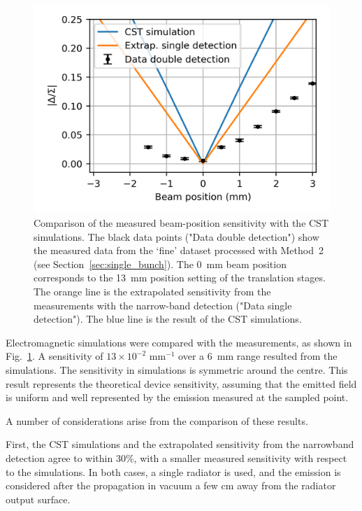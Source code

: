 \begin{figure}[!t]
\centering
\includegraphics[scale=1, keepaspectratio]{pictures/sim_vs_data_abs}
\caption{Comparison of the measured beam-position sensitivity with the CST simulations. The black data points ("Data double detection") show the measured data from the `fine' dataset processed with Method~2 (see Section~\ref{sec:single_bunch}). The 0~mm beam position corresponds to the 13~mm position setting of the translation stages. The orange line is the extrapolated sensitivity from the measurements with the narrow-band detection ("Data single detection"). The blue line is the result of the CST simulations.}
\label{fig:comparison_simulations_data}
\end{figure}

Electromagnetic simulations were compared with the measurements, as shown in Fig.~\ref{fig:comparison_simulations_data}. A sensitivity of ${13\times 10^{-2} \text{ mm}^{-1}}$ over a 6~mm range resulted from the simulations. The sensitivity in simulations is symmetric around the centre. This result represents the theoretical device sensitivity, assuming that the emitted field is uniform and well represented by the emission measured at the sampled point. 

A number of considerations arise from the comparison of these results.

First, the CST simulations and the extrapolated sensitivity from the narrowband detection agree to within 30\%, with a smaller measured sensitivity with respect to the simulations. In both cases, a single radiator is used, and the emission is considered after the propagation in vacuum a few cm away from the radiator output surface. 

